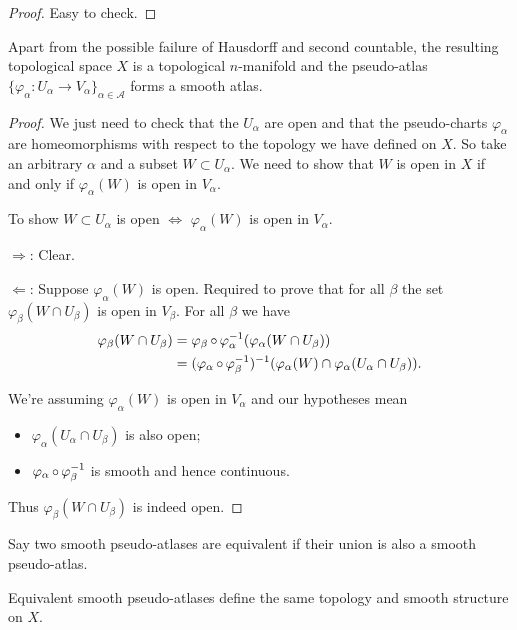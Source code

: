 \documentclass[a4paper,11pt]{article}
\begin{document}
	\begin{proof}
		Easy to check.
	\end{proof}

	\begin{prop}
		Apart from the possible failure of Hausdorff and second countable, the resulting topological space $X$ is a topological $n$-manifold and the pseudo-atlas $\{\varphi_\alpha : U_\alpha \to V_\alpha\}_{\alpha\in \mathcal{A}}$ forms a smooth atlas.
	\end{prop}

	\begin{proof}
		We just need to check that the $U_\alpha$ are open and that the pseudo-charts $\varphi_\alpha$ are homeomorphisms with respect to the topology we have defined on $X$. So take an arbitrary $\alpha$ and a subset $W \subset U_\alpha$. We need to show that $W$ is open in $X$ if and only if $\varphi_\alpha(W)$ is open in $V_\alpha$.
		
		To show $W \subset U_\alpha$ is open $\Leftrightarrow$ $\varphi_\alpha(W)$ is open in $V_\alpha$.

		$\Rightarrow$: Clear.

		$\Leftarrow$: Suppose $\varphi_\alpha(W)$ is open. Required to prove that for all $\beta$ the set $\varphi_\beta (W\cap U_\beta)$ is open in $V_\beta$. For all $\beta$ we have
		\begin{align*}
			\varphi_\beta (W \cap U_\beta) & = \varphi_\beta \operatorname{\circ} \varphi_\alpha^{-1} ( \varphi_\alpha (W\cap U_\beta))\\
			& = (\varphi_\alpha \operatorname{\circ} \varphi_\beta^{-1})^{-1} (\varphi_\alpha(W)\cap \varphi_\alpha(U_\alpha \cap U_\beta)).
		\end{align*}

		We're assuming $\varphi_\alpha(W)$ is open in $V_\alpha$ and our hypotheses mean
		\begin{itemize}
			\item $\varphi_\alpha(U_\alpha\cap U_\beta)$ is also open;
			\item $\varphi_\alpha \operatorname{\circ} \varphi_\beta^{-1}$ is smooth and hence continuous.
		\end{itemize}

		Thus $\varphi_\beta(W \cap U_\beta)$ is indeed open.
	\end{proof}

	Say two smooth pseudo-atlases are equivalent if their union is also a smooth pseudo-atlas.

	\begin{lem}
		Equivalent smooth pseudo-atlases define the same topology and smooth structure on $X$.
	\end{lem}
\end{document}
